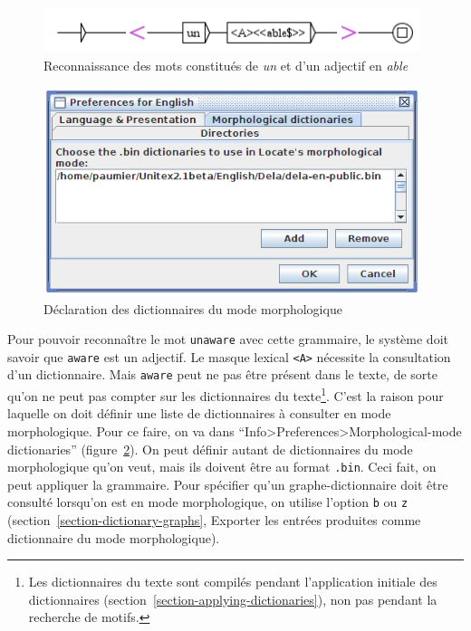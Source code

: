 \begin{figure}[!ht]
\begin{center}
\includegraphics[width=11cm]{resources/img/fig6-17m.png}
\caption{Reconnaissance des mots constitués de \textit{un} et d'un adjectif en 
\textit{able}\label{fig-morpho3}}
\end{center}
\end{figure}

\begin{figure}[!ht]
\begin{center}
\includegraphics[width=11cm]{resources/img/fig6-17n.png}
\caption{Déclaration des dictionnaires du mode morphologique\label{fig-morpho4}}
\end{center}
\end{figure}

\bigskip
\noindent Pour pouvoir reconnaître le mot 
\verb+unaware+ avec cette grammaire, le système doit savoir que \verb+aware+ est un adjectif. 
Le masque lexical \verb+<A>+ nécessite la consultation d'un dictionnaire. Mais
\verb+aware+ peut ne pas être présent dans le texte, de sorte qu'on ne peut pas compter
sur les dictionnaires du texte\footnote{Les dictionnaires du texte sont compilés pendant l'application
initiale des dictionnaires (section~\ref{section-applying-dictionaries}), non pas pendant la recherche
de motifs.}.
C'est la raison pour laquelle on doit définir une liste de
dictionnaires à consulter en mode morphologique.
Pour ce faire, on va dans ``Info>Preferences>Morphological-mode dictionaries''
(figure~\ref{fig-morpho4}).
On peut définir autant de dictionnaires du mode morphologique qu'on veut, mais ils doivent
être au format \verb+.bin+. Ceci fait, on peut appliquer la grammaire.
Pour spécifier qu'un graphe-dictionnaire doit être consulté lorsqu'on est en mode morphologique,
on utilise l'option \verb+b+ ou \verb+z+ (section~\ref{section-dictionary-graphs}, Exporter les entrées produites
comme dictionnaire du mode morphologique).

